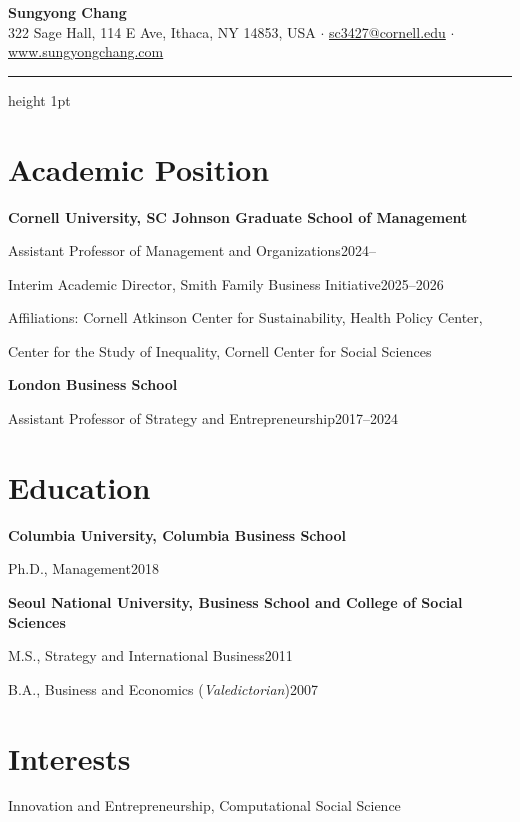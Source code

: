 \documentclass[11pt]{article}
\newcommand{\role}[2]{\hspace*{1.2em}#1\hfill{\color{softgray}#2}\par}
\newcommand{\org}[1]{\vspace{2pt}\textbf{#1}\par}
\begin{document}
{\Huge\bfseries\color{accent}Sungyong Chang}\\[4pt]
{\color{softgray}\small
322 Sage Hall, 114 E Ave, Ithaca, NY 14853, USA \quad$\cdot$\quad
\href{mailto:sc3427@cornell.edu}{sc3427@cornell.edu} \quad$\cdot$\quad
\href{http://www.sungyongchang.com}{www.sungyongchang.com}}
\vspace{2pt}
{\color{accent}\hrule height 1pt}
\vspace{-2pt}
\section{Academic Position}
\org{Cornell University, SC Johnson Graduate School of Management}
\role{Assistant Professor of Management and Organizations}{2024--}
\role{Interim Academic Director, Smith Family Business Initiative}{2025--2026}
\hspace*{1.2em}Affiliations: Cornell Atkinson Center for Sustainability, Health Policy Center,\par
\hspace*{2.4em}Center for the Study of Inequality, Cornell Center for Social Sciences\par
\org{London Business School}
\role{Assistant Professor of Strategy and Entrepreneurship}{2017--2024}
\section{Education}
\org{Columbia University, Columbia Business School}
\role{Ph.D., Management}{2018}
\org{Seoul National University, Business School and College of Social Sciences}
\role{M.S., Strategy and International Business}{2011}
\role{B.A., Business and Economics (\emph{Valedictorian})}{2007}
\section{Interests}
\vspace{3pt}
Innovation and Entrepreneurship, Computational Social Science
\end{document}
